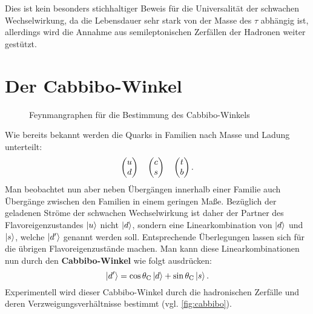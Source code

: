 Dies ist kein besonders stichhaltiger Beweis für die Universalität der schwachen Wechselwirkung, da die Lebensdauer sehr stark von der Masse des $\tau$ abhängig ist,
allerdings wird die Annahme aus semileptonischen Zerfällen der Hadronen weiter gestützt.

\section{Der Cabbibo-Winkel}
\begin{figure}
	\caption{Feynmangraphen für die Bestimmung des Cabbibo-Winkels}
	\label{fig:cabbibo}
\end{figure}

Wie bereits bekannt werden die Quarks in Familien nach Masse und Ladung unterteilt:
\begin{equation*}
	\begin{pmatrix} u \\ d \end{pmatrix}\quad\begin{pmatrix} c \\ s \end{pmatrix}\quad\begin{pmatrix} t \\ b \end{pmatrix}.
\end{equation*}
Man beobachtet nun aber neben Übergängen innerhalb einer Familie auch Übergänge zwischen den Familien in einem geringen Maße.
Bezüglich der geladenen Ströme der schwachen Wechselwirkung ist daher der Partner des Flavoreigenzustandes $\ket{u}$ nicht $\ket{d}$, sondern eine Linearkombination von $\ket{d}$ und $\ket{s}$, welche $\ket{d'}$ genannt werden soll.
Entsprechende Überlegungen lassen sich für die übrigen Flavoreigenzustände machen.
Man kann diese Linearkombinationen nun durch den \textbf{Cabbibo-Winkel} wie folgt ausdrücken:
\begin{equation*}
	\ket{d'} = \cos\theta_\text{C}\ket{d} + \sin\theta_\text{C}\ket{s}.
\end{equation*}
Experimentell wird dieser Cabbibo-Winkel durch die hadronischen Zerfälle und deren Verzweigungsverhältnisse bestimmt (vgl. \autoref{fig:cabbibo}).

